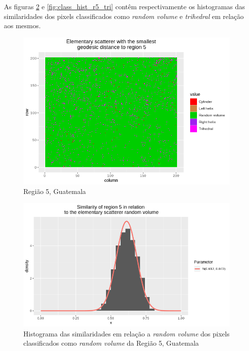 \documentclass[12pt]{article}
\begin{document}
As figuras \ref{fig:class_hist_r5_rv} e \ref{fig:class_hist_r5_tri} contêm respectivamente os histogramas das similaridades dos pixels classificados como \textit{random volume} e \textit{trihedral} em relação aos mesmos.

\begin{figure}[!h]
    \centering    
    \includegraphics[width = 0.9\linewidth]{../../Images/Report_18_12_20/Classifier_Geo_Dist/Class_Map/Guate/region5_predomain.png}
    \caption{Região 5, Guatemala}
    \label{fig:class_map_r5}
\end{figure}

\begin{figure}[!h]
    \centering   
    \vspace{0.1\linewidth}
    \includegraphics[width = 0.9\linewidth]{../../Images/Report_18_12_20/Classifier_Geo_Dist/Histograms/Guate/region5_rv_sm_filter.png}
    \caption{Histograma das similaridades em relação a \textit{random volume} dos pixels classificados como \textit{random volume} da Região 5, Guatemala}
    \label{fig:class_hist_r5_rv}
\end{figure}
\end{document}
